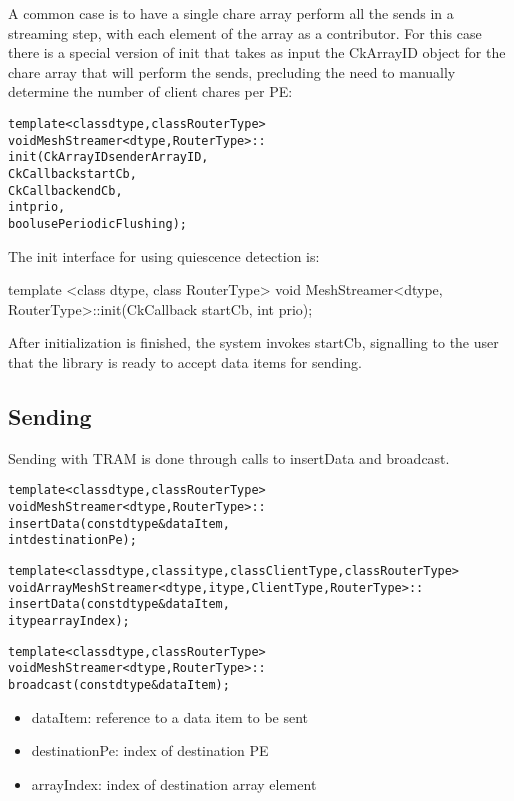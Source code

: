 A common case is to have a single chare array perform all the sends in a
streaming step, with each element of the array as a contributor. For this case
there is a special version of init that takes as input the CkArrayID object for
the chare array that will perform the sends, precluding the need to manually
determine the number of client chares per PE:

\begin{alltt}
template <class dtype, class RouterType>
void MeshStreamer<dtype, RouterType>::
init(CkArrayID senderArrayID,
     CkCallback startCb,
     CkCallback endCb,
     int prio,
     bool usePeriodicFlushing);
\end{alltt}

The init interface for using quiescence detection is:

template <class dtype, class RouterType>
void MeshStreamer<dtype, RouterType>::init(CkCallback startCb, int prio);

After initialization is finished, the system invokes startCb,
signalling to the user that the library is ready to accept data items
for sending.
\\


\subsection{Sending}

Sending with TRAM is done through calls to insertData and broadcast.

\begin{alltt}
template <class dtype, class RouterType>
void MeshStreamer<dtype, RouterType>::
insertData(const dtype& dataItem,
           int destinationPe);

template <class dtype, class itype, class ClientType, class RouterType>
void ArrayMeshStreamer<dtype, itype, ClientType, RouterType>::
insertData(const dtype& dataItem,
           itype arrayIndex);

template <class dtype, class RouterType>
void MeshStreamer<dtype, RouterType>::
broadcast(const dtype& dataItem);
\end{alltt}

\begin{itemize}
\item dataItem: reference to a data item to be sent
\item destinationPe: index of destination PE
\item arrayIndex: index of destination array element
\end{itemize}

